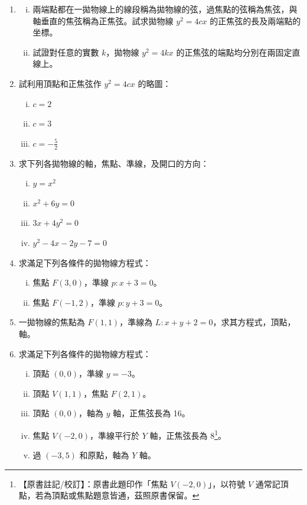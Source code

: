 \begin{enumerate}
  \item
  \begin{enumerate}[(i)]
    \item 兩端點都在一拋物線上的線段稱為拋物線的弦，過焦點的弦稱為焦弦，與軸垂直的焦弦稱為正焦弦。試求拋物線 $y^2 = 4cx$ 的正焦弦的長及兩端點的坐標。
    \item 試證對任意的實數 $k$，拋物線 $y^2 = 4kx$ 的正焦弦的端點均分別在兩固定直線上。
  \end{enumerate}

  \item 試利用頂點和正焦弦作 $y^2 = 4cx$ 的略圖：
  \begin{enumerate}[(i)]
    \item $c = 2$
    \item $c = 3$
    \item $c = -\frac{5}{2}$
  \end{enumerate}

  \item 求下列各拋物線的軸，焦點、準線，及開口的方向：
  \begin{enumerate}[(i)]
    \item $y = x^2$
    \item $x^2 + 6y = 0$
    \item $3x + 4y^2 = 0$
    \item $y^2 - 4x - 2y - 7 = 0$
  \end{enumerate}

  \item 求滿足下列各條件的拋物線方程式：
  \begin{enumerate}[(i)]
    \item 焦點 $F(3,0)$，準線 $p: x + 3 = 0$。
    \item 焦點 $F(-1,2)$，準線 $p: y + 3 = 0$。
  \end{enumerate}

  \item 一拋物線的焦點為 $F(1,1)$，準線為 $L: x + y + 2 = 0$，求其方程式，頂點，軸。

  \item[*\theenumi.] 求滿足下列各條件的拋物線方程式：
  \begin{enumerate}[(i)]
    \item 頂點 $(0,0)$，準線 $y = -3$。
    \item 頂點 $V(1,1)$，焦點 $F(2,1)$。
    \item 頂點 $(0,0)$，軸為 $y$ 軸，正焦弦長為 16。
    \item 焦點 $V(-2,0)$，準線平行於 $Y$ 軸，正焦弦長為 8\label{note:b4-ch3-ex3-6-4}\footnote{【原書註記/校訂】：原書此題印作「焦點 $V(-2,0)$」，以符號 $V$ 通常記頂點，若為頂點或焦點題意皆通，茲照原書保留。}。
    \item 過 $(-3,5)$ 和原點，軸為 $Y$ 軸。
  \end{enumerate}


\end{enumerate}
